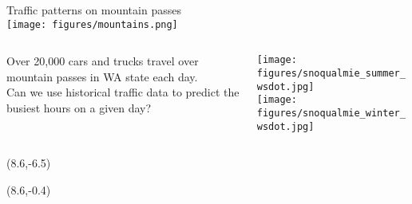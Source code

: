 \documentclass{beamer}
\begin{document}



\begin{frame}[plain]
	\begin{center}
		{\LARGE{Traffic patterns on mountain passes}} \\
		\vspace{2em}
		\texttt{[image: figures/mountains.png]} \\
		\vspace{1em}
		{\Large{\color{white}{Laura Kehrl}}}
	\end{center}
\end{frame}

\begin{frame}[plain]
	\begin{columns}
		\begin{column}{0.45\textwidth}
			\Large{Over 20,000 cars and trucks travel over mountain passes in WA state each day.}  \\
			\vspace{2em}
			Can we use historical traffic data to predict the busiest hours on a given day? \\
		\end{column}
		\begin{column}{0.4\textwidth}
			\texttt{[image: figures/snoqualmie\_summer\_wsdot.jpg]} \\
			\vspace{1em}
			\texttt{[image: figures/snoqualmie\_winter\_wsdot.jpg]}
		\end{column}
	\end{columns}
	\begin{textblock}{6}(8.6,-6.5)
		{\tiny{\color{black}{\copyright WSDOT}}}
	\end{textblock}
	\begin{textblock}{6}(8.6,-0.4)
		{\tiny{\color{black}{\copyright WSDOT}}}
	\end{textblock}
\end{frame}
\end{document}
